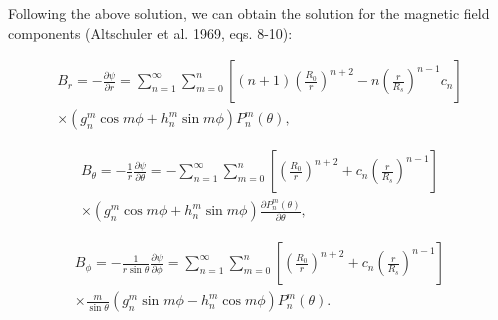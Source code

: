 Following the above solution, we can obtain the solution for the magnetic 
field components (Altschuler et al. 1969, eqs. 8-10):

\begin{eqnarray}
\label{eq:Br2}
B_r=-\frac{\partial \psi}{\partial r}=\mathop{\sum}_{n=1}^{\infty} 
\mathop{\sum}_{m=0}^{n} 
\left[ (n+1)\left( \frac{R_0}{r} \right)^{n+2}-n\left( \frac{r}{R_s} \right)
^{n-1}c_n \right] 
\nonumber \\
\times \left(g_n^m \cos{m\phi} + h_n^m \sin{m\phi} \right)P_n^m(\theta),
\end{eqnarray}

\begin{eqnarray}
\label{eq:Btheta2}
B_\theta=-\frac{1}{r}\frac{\partial \psi}{\partial \theta}=-\mathop{\sum}_{n=1}
^{\infty} 
\mathop{\sum}_{m=0}^{n} 
\left[ \left( \frac{R_0}{r} \right)^{n+2}+c_n \left( \frac{r}{R_s} \right)
^{n-1} \right] 
\nonumber \\
\times \left(g_n^m \cos{m\phi} + h_n^m \sin{m\phi} \right)\frac{\partial 
P_n^m(\theta)}{\partial \theta},
\end{eqnarray}

\begin{eqnarray}
\label{eq:Bphi2}
B_\phi=-\frac{1}{r\sin{\theta}}\frac{\partial \psi}{\partial \phi}=
\mathop{\sum}_{n=1}^{\infty} \mathop{\sum}_{m=0}^{n} 
\left[\left( \frac{R_0}{r} \right)^{n+2}+c_n \left( \frac{r}{R_s} \right)
^{n-1} \right]\nonumber \\
\times \frac{m}{\sin{\theta}} \left(g_n^m \sin{m\phi} - h_n^m \cos{m\phi} 
\right)P_n^m(\theta).
\end{eqnarray}

